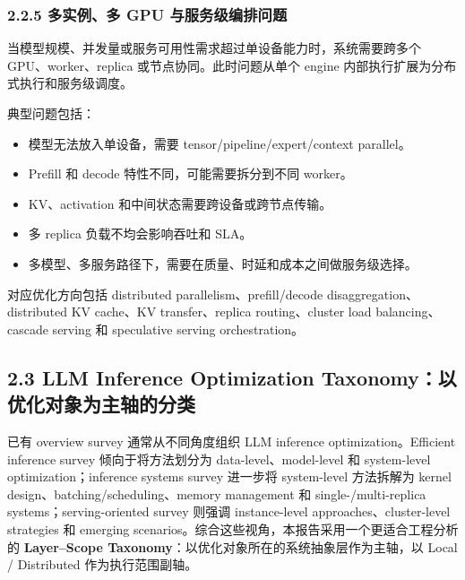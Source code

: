 \documentclass[a4paper,10pt]{ctexart}
\begin{document}
\subsubsection*{2.2.5 多实例、多 GPU 与服务级编排问题}

当模型规模、并发量或服务可用性需求超过单设备能力时，系统需要跨多个 GPU、worker、replica 或节点协同。此时问题从单个 engine 内部执行扩展为分布式执行和服务级调度。


典型问题包括：


\begin{itemize}
\item 模型无法放入单设备，需要 tensor/pipeline/expert/context parallel。

\item Prefill 和 decode 特性不同，可能需要拆分到不同 worker。

\item KV、activation 和中间状态需要跨设备或跨节点传输。

\item 多 replica 负载不均会影响吞吐和 SLA。

\item 多模型、多服务路径下，需要在质量、时延和成本之间做服务级选择。

\end{itemize}
对应优化方向包括 distributed parallelism、prefill/decode disaggregation、distributed KV cache、KV transfer、replica routing、cluster load balancing、cascade serving 和 speculative serving orchestration。




\subsection*{2.3 LLM Inference Optimization Taxonomy：以优化对象为主轴的分类}

已有 overview survey 通常从不同角度组织 LLM inference optimization。Efficient inference survey 倾向于将方法划分为 data-level、model-level 和 system-level optimization；inference systems survey 进一步将 system-level 方法拆解为 kernel design、batching/scheduling、memory management 和 single-/multi-replica systems；serving-oriented survey 则强调 instance-level approaches、cluster-level strategies 和 emerging scenarios。综合这些视角，本报告采用一个更适合工程分析的 \textbf{Layer–Scope Taxonomy}：以优化对象所在的系统抽象层作为主轴，以 Local / Distributed 作为执行范围副轴。
\end{document}
